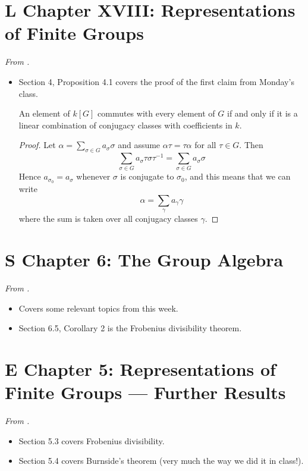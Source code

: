 \documentclass[../notes.tex]{subfiles}
\begin{document}
\section{L Chapter XVIII: Representations of Finite Groups}
\emph{From \textcite{bib:Lang}.}
\setcounter{Lsection}{4}
\begin{itemize}
    \item {}Section 4, Proposition 4.1 covers the proof of the first claim from Monday's class.
    \begin{Lproposition}
        An element of $k[G]$ commutes with every element of $G$ if and only if it is a linear combination of conjugacy classes with coefficients in $k$.
        \begin{proof}
            Let $\alpha=\sum_{\sigma\in G}a_\sigma\sigma$ and assume $\alpha\tau=\tau\alpha$ for all $\tau\in G$. Then
            \begin{equation*}
                \sum_{\sigma\in G}a_\sigma\tau\sigma\tau^{-1} = \sum_{\sigma\in G}a_\sigma\sigma
            \end{equation*}
            Hence $a_{\sigma_0}=a_\sigma$ whenever $\sigma$ is conjugate to $\sigma_0$, and this means that we can write
            \begin{equation*}
                \alpha = \sum_\gamma a_\gamma\gamma
            \end{equation*}
            where the sum is taken over all conjugacy classes $\gamma$.
        \end{proof}
    \end{Lproposition}
\end{itemize}



\section{S Chapter 6: The Group Algebra}
\emph{From \textcite{bib:Serre}.}
\begin{itemize}
    \item {}Covers some relevant topics from this week.
    \item Section 6.5, Corollary 2 is the Frobenius divisibility theorem.
\end{itemize}



\section{E Chapter 5: Representations of Finite Groups --- Further Results}
\emph{From \textcite{bib:Etingof}.}
\begin{itemize}
    \item Section 5.3 covers Frobenius divisibility.
    \item Section 5.4 covers Burnside's theorem (very much the way we did it in class!).
\end{itemize}
\end{document}
